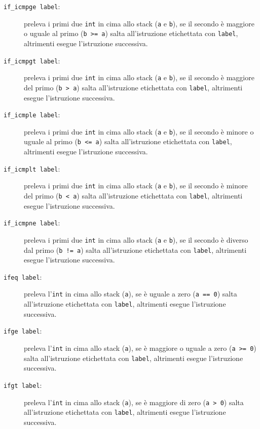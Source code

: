 \begin{description}
  \item[\texttt{if\_icmpge label}:] preleva i primi due \texttt{int} in cima allo stack (\texttt{a} e \texttt{b}), se il secondo \`e maggiore o uguale al primo (\texttt{b >= a}) salta all'istruzione etichettata con \texttt{label}, altrimenti esegue l'istruzione successiva.

  \item[\texttt{if\_icmpgt label}:] preleva i primi due \texttt{int} in cima allo stack (\texttt{a} e \texttt{b}), se il secondo \`e maggiore del primo (\texttt{b > a}) salta all'istruzione etichettata con \texttt{label}, altrimenti esegue l'istruzione successiva.

  \item[\texttt{if\_icmple label}:] preleva i primi due \texttt{int} in cima allo stack (\texttt{a} e \texttt{b}), se il secondo \`e minore o uguale al primo (\texttt{b <= a}) salta all'istruzione etichettata con \texttt{label}, altrimenti esegue l'istruzione successiva.

  \item[\texttt{if\_icmplt label}:] preleva i primi due \texttt{int} in cima allo stack (\texttt{a} e \texttt{b}), se il secondo \`e minore del primo (\texttt{b < a}) salta all'istruzione etichettata con \texttt{label}, altrimenti esegue l'istruzione successiva.

  \item[\texttt{if\_icmpne label}:] preleva i primi due \texttt{int} in cima allo stack (\texttt{a} e \texttt{b}), se il secondo \`e diverso dal primo (\texttt{b != a}) salta all'istruzione etichettata con \texttt{label}, altrimenti esegue l'istruzione successiva.

  \item[\texttt{ifeq label}:] preleva l'\texttt{int} in cima allo stack (\texttt{a}), se \`e uguale a zero (\texttt{a == 0}) salta all'istruzione etichettata con \texttt{label}, altrimenti esegue l'istruzione successiva.

  \item[\texttt{ifge label}:] preleva l'\texttt{int} in cima allo stack (\texttt{a}), se \`e maggiore o uguale a zero (\texttt{a >= 0}) salta all'istruzione etichettata con \texttt{label}, altrimenti esegue l'istruzione successiva.

  \item[\texttt{ifgt label}:] preleva l'\texttt{int} in cima allo stack (\texttt{a}), se \`e maggiore di zero (\texttt{a > 0}) salta all'istruzione etichettata con \texttt{label}, altrimenti esegue l'istruzione successiva.


\end{description}
